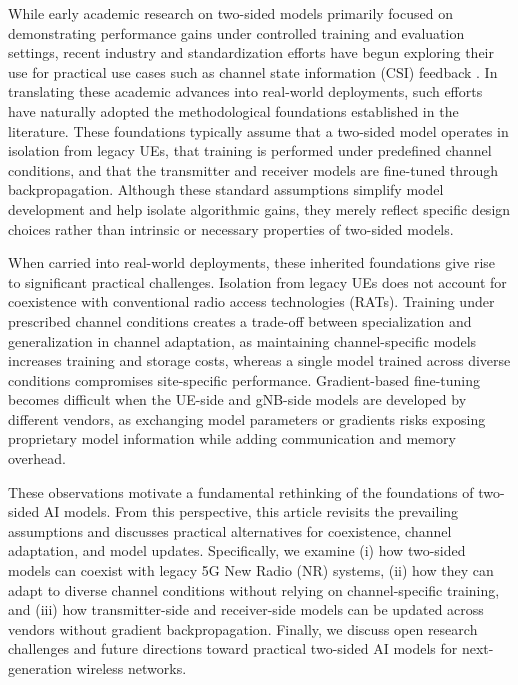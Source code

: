 \documentclass[10pt,twocolumn]{IEEEtran}
\begin{document}
While early academic research on two-sided models primarily focused on demonstrating performance gains under controlled training and evaluation settings, recent industry and standardization efforts have begun exploring their use for practical use cases such as channel state information (CSI) feedback \cite{3gpp_tr38843_rel19,9970357}. In translating these academic advances into real-world deployments, such efforts have naturally adopted the methodological foundations established in the literature. These foundations typically assume that a two-sided model operates in isolation from legacy UEs, that training is performed under predefined channel conditions, and that the transmitter and receiver models are fine-tuned through backpropagation. 
Although these standard assumptions simplify model development and help isolate algorithmic gains, they merely reflect specific design choices rather than intrinsic or necessary properties of two-sided models.

When carried into real-world deployments, these inherited foundations give rise to significant practical challenges. Isolation from legacy UEs does not account for coexistence with conventional radio access technologies (RATs). Training under prescribed channel conditions creates a trade-off between specialization and generalization in channel adaptation, as maintaining channel-specific models increases training and storage costs, whereas a single model trained across diverse conditions compromises site-specific performance. Gradient-based fine-tuning becomes difficult when the UE-side and gNB-side models are developed by different vendors, as exchanging model parameters or gradients risks exposing proprietary model information while adding communication and memory overhead. 

These observations motivate a fundamental rethinking of the foundations of two-sided AI models. From this perspective, this article revisits the prevailing assumptions and discusses practical alternatives for coexistence, channel adaptation, and model updates. Specifically, we examine (i) how two-sided models can coexist with legacy 5G New Radio (NR) systems, (ii) how they can adapt to diverse channel conditions without relying on channel-specific training, and (iii) how transmitter-side and receiver-side models can be updated across vendors without gradient backpropagation. Finally, we discuss open research challenges and future directions toward practical two-sided AI models for next-generation wireless networks. 
\end{document}
